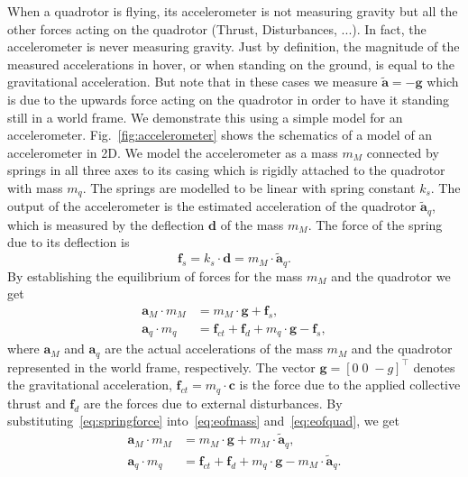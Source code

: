 \documentclass[12pt,a4paper,fleqn]{article}
\newcommand{\bVec}[1]{\mathbf{#1}}
\begin{document}
When a quadrotor is flying, its accelerometer is not measuring gravity but all the other forces acting on the quadrotor (Thrust, Disturbances, ...). 
In fact, the accelerometer is never measuring gravity. 
Just by definition, the magnitude of the measured accelerations in hover, or when standing on the ground, is equal to the gravitational acceleration. 
But note that in these cases we measure $\tilde{\bVec{a}} = -\bVec{g}$ which is due to the upwards force acting on the quadrotor in order to have it standing still in a world frame. 
We demonstrate this using a simple model for an accelerometer. 
Fig.~\ref{fig:accelerometer} shows the schematics of a model of an accelerometer in 2D. 
We model the accelerometer as a mass $m_M$ connected by springs in all three axes to its casing which is rigidly attached to the quadrotor with mass $m_q$. 
The springs are modelled to be linear with spring constant $k_s$. 
The output of the accelerometer is the estimated acceleration of the quadrotor $\tilde{\bVec{a}}_q$, which is measured by the deflection $\bVec{d}$ of the mass $m_M$. 
The force of the spring due to its deflection is
%
\begin{equation}
	\bVec{f}_s = k_s \cdot \bVec{d} = m_M \cdot \tilde{\bVec{a}}_q .
	\label{eq:springforce}
\end{equation}
%
By establishing the equilibrium of forces for the mass $m_M$ and the quadrotor we get
%
\begin{align}
	\bVec{a}_M \cdot m_M &= m_M \cdot \bVec{g} + \bVec{f}_s , \label{eq:eofmass} \\ 
	\bVec{a}_q \cdot m_q &= \bVec{f}_{ct} + \bVec{f}_{d} + m_q \cdot \bVec{g} - \bVec{f}_s , \label{eq:eofquad}
\end{align}
%
where $\bVec{a}_M$ and $\bVec{a}_q$ are the actual accelerations of the mass $m_M$ and the quadrotor represented in the world frame, respectively. 
The vector $\bVec{g} = [0 \; 0 \; -g]^{\top}$ denotes the gravitational acceleration, $\bVec{f}_{ct} = m_q \cdot \bVec{c}$ is the force due to the applied collective thrust and $\bVec{f}_{d}$ are the forces due to external disturbances. 
By substituting~\eqref{eq:springforce} into~\eqref{eq:eofmass} and~\eqref{eq:eofquad}, we get
%
\begin{align}
	\bVec{a}_M \cdot m_M &= m_M \cdot \bVec{g} + m_M \cdot \tilde{\bVec{a}}_q , \label{eq:eofmasssubs} \\
	\bVec{a}_q \cdot m_q &= \bVec{f}_{ct} + \bVec{f}_{d} + m_q \cdot \bVec{g} - m_M \cdot \tilde{\bVec{a}}_q . \label{eq:eofquadsubs}
\end{align}
\end{document}
